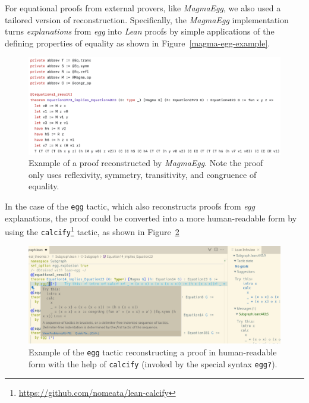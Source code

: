 
For equational proofs from external provers, like \emph{MagmaEgg}, we also used a tailored version of reconstruction. 
Specifically, the \emph{MagmaEgg} implementation turns \emph{explanations} \cite{nieuwenhuis2005proof} from \emph{egg} into \emph{Lean} proofs by simple applications of the defining properties of equality as shown in Figure~\ref{magma-egg-example}.

\begin{figure}
  \centering
  \includegraphics[width=\textwidth]{magma-egg-example.png}
  \caption{Example of a proof reconstructed by \emph{MagmaEgg}. Note the proof only uses reflexivity, symmetry, transitivity, and congruence of equality.}
  \label{fig:magma-egg-example}
\end{figure}

In the case of the \texttt{egg} tactic, which also reconstructs proofs from \emph{egg} explanations, the proof could be converted into a more human-readable form by using the \texttt{calcify}\footnote{\url{https://github.com/nomeata/lean-calcify}} tactic, as shown in Figure~\ref{fig:egg-example}

\begin{figure}
  \centering
  \includegraphics[width=\textwidth]{egg-example.png}
  \caption{Example of the \texttt{egg} tactic reconstructing a proof in human-readable form with the help of \texttt{calcify} (invoked by the special syntax \texttt{egg?}).}
  \label{fig:egg-example}
\end{figure}

